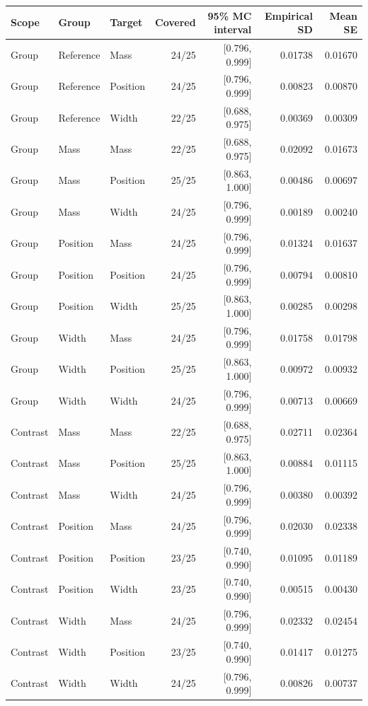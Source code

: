 \begin{tabular}{@{}lllrrrr@{}}
\toprule
Scope & Group & Target & Covered & 95\% MC interval & Empirical SD & Mean SE \\
\midrule
Group & Reference & Mass & 24/25 & [0.796, 0.999] & 0.01738 & 0.01670 \\
Group & Reference & Position & 24/25 & [0.796, 0.999] & 0.00823 & 0.00870 \\
Group & Reference & Width & 22/25 & [0.688, 0.975] & 0.00369 & 0.00309 \\
\addlinespace[3pt]
Group & Mass & Mass & 22/25 & [0.688, 0.975] & 0.02092 & 0.01673 \\
Group & Mass & Position & 25/25 & [0.863, 1.000] & 0.00486 & 0.00697 \\
Group & Mass & Width & 24/25 & [0.796, 0.999] & 0.00189 & 0.00240 \\
\addlinespace[3pt]
Group & Position & Mass & 24/25 & [0.796, 0.999] & 0.01324 & 0.01637 \\
Group & Position & Position & 24/25 & [0.796, 0.999] & 0.00794 & 0.00810 \\
Group & Position & Width & 25/25 & [0.863, 1.000] & 0.00285 & 0.00298 \\
\addlinespace[3pt]
Group & Width & Mass & 24/25 & [0.796, 0.999] & 0.01758 & 0.01798 \\
Group & Width & Position & 25/25 & [0.863, 1.000] & 0.00972 & 0.00932 \\
Group & Width & Width & 24/25 & [0.796, 0.999] & 0.00713 & 0.00669 \\
\addlinespace[3pt]
Contrast & Mass & Mass & 22/25 & [0.688, 0.975] & 0.02711 & 0.02364 \\
Contrast & Mass & Position & 25/25 & [0.863, 1.000] & 0.00884 & 0.01115 \\
Contrast & Mass & Width & 24/25 & [0.796, 0.999] & 0.00380 & 0.00392 \\
\addlinespace[3pt]
Contrast & Position & Mass & 24/25 & [0.796, 0.999] & 0.02030 & 0.02338 \\
Contrast & Position & Position & 23/25 & [0.740, 0.990] & 0.01095 & 0.01189 \\
Contrast & Position & Width & 23/25 & [0.740, 0.990] & 0.00515 & 0.00430 \\
\addlinespace[3pt]
Contrast & Width & Mass & 24/25 & [0.796, 0.999] & 0.02332 & 0.02454 \\
Contrast & Width & Position & 23/25 & [0.740, 0.990] & 0.01417 & 0.01275 \\
Contrast & Width & Width & 24/25 & [0.796, 0.999] & 0.00826 & 0.00737 \\
\bottomrule
\end{tabular}
